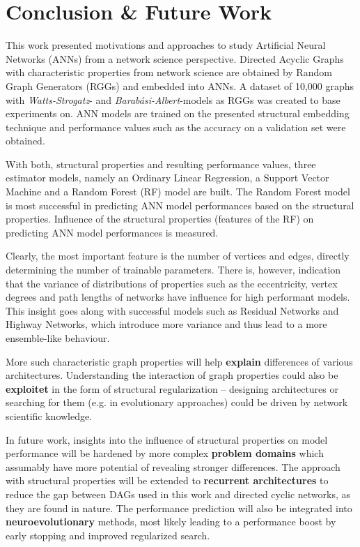\documentclass[runningheads]{llncs}
\begin{document}
\section{Conclusion \& Future Work}
This work presented motivations and approaches to study Artificial Neural Networks (ANNs) from a network science perspective.
Directed Acyclic Graphs with characteristic properties from network science are obtained by Random Graph Generators (RGGs) and embedded into ANNs.
A dataset of 10,000 graphs with \textit{Watts-Strogatz}- and \textit{Barabási-Albert}-models as RGGs was created to base experiments on.
ANN models are trained on the presented structural embedding technique and performance values such as the accuracy on a validation set were obtained.

With both, structural properties and resulting performance values, three estimator models, namely an Ordinary Linear Regression, a Support Vector Machine and a Random Forest (RF) model are built.
The Random Forest model is most successful in predicting ANN model performances based on the structural properties.
Influence of the structural properties (features of the RF) on predicting ANN model performances is measured.

Clearly, the most important feature is the number of vertices and edges, directly determining the number of trainable parameters.
There is, however, indication that the variance of distributions of properties such as the eccentricity, vertex degrees and path lengths of networks have influence for high performant models.
This insight goes along with successful models such as Residual Networks and Highway Networks, which introduce more variance and thus lead to a more ensemble-like behaviour.

More such characteristic graph properties will help \textbf{explain} differences of various architectures.
Understanding the interaction of graph properties could also be \textbf{exploitet} in the form of structural regularization -- designing architectures or searching for them (e.g. in evolutionary approaches) could be driven by network scientific knowledge.

In future work, insights into the influence of structural properties on model performance will be hardened by more complex \textbf{problem domains} which assumably have more potential of revealing stronger differences.
The approach with structural properties will be extended to \textbf{recurrent architectures} to reduce the gap between DAGs used in this work and directed cyclic networks, as they are found in nature.
The performance prediction will also be integrated into \textbf{neuroevolutionary} methods, most likely leading to a performance boost by early stopping and improved regularized search.
\end{document}

